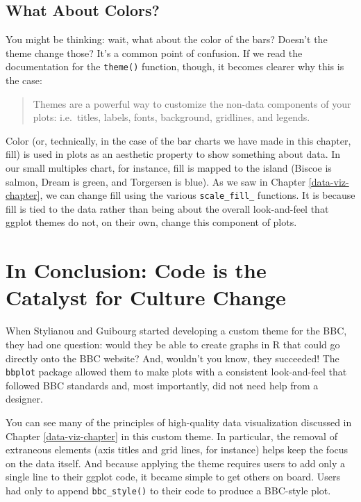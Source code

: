 \documentclass[
]{book}
\begin{document}
\hypertarget{what-about-colors}{%
\subsection*{What About Colors?}\label{what-about-colors}}

You might be thinking: wait, what about the color of the bars? Doesn't the theme change those? It's a common point of confusion. If we read the documentation for the \texttt{theme()} function, though, it becomes clearer why this is the case:

\begin{quote}
Themes are a powerful way to customize the non-data components of your plots: i.e.~titles, labels, fonts, background, gridlines, and legends.
\end{quote}

Color (or, technically, in the case of the bar charts we have made in this chapter, fill) is used in plots as an aesthetic property to show something about data. In our small multiples chart, for instance, fill is mapped to the island (Biscoe is salmon, Dream is green, and Torgersen is blue). As we saw in Chapter \ref{data-viz-chapter}, we can change fill using the various \texttt{scale\_fill\_} functions. It is because fill is tied to the data rather than being about the overall look-and-feel that ggplot themes do not, on their own, change this component of plots.

\hypertarget{in-conclusion-code-is-the-catalyst-for-culture-change}{%
\section*{In Conclusion: Code is the Catalyst for Culture Change}\label{in-conclusion-code-is-the-catalyst-for-culture-change}}

When Stylianou and Guibourg started developing a custom theme for the BBC, they had one question: would they be able to create graphs in R that could go directly onto the BBC website? And, wouldn't you know, they succeeded! The \texttt{bbplot} package allowed them to make plots with a consistent look-and-feel that followed BBC standards and, most importantly, did not need help from a designer.

You can see many of the principles of high-quality data visualization discussed in Chapter \ref{data-viz-chapter} in this custom theme. In particular, the removal of extraneous elements (axis titles and grid lines, for instance) helps keep the focus on the data itself. And because applying the theme requires users to add only a single line to their ggplot code, it became simple to get others on board. Users had only to append \texttt{bbc\_style()} to their code to produce a BBC-style plot.
\end{document}

